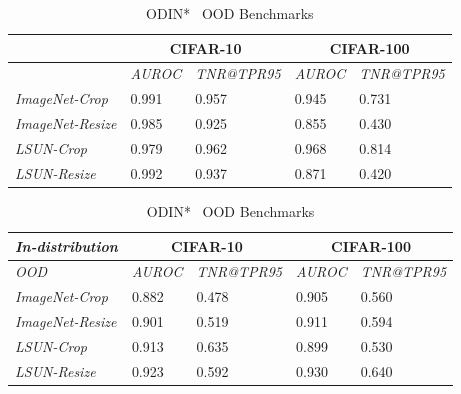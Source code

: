 \documentclass[accepted]{uai2022} %
\begin{document}
\begin{table}[t]
    \setlength\tabcolsep{4pt}
    \centering
    \caption{ODIN~\citep{Liang:ICLR:2018:ODIN} OOD Benchmarks}
        \label{Tab:ood_odin}
         
        \begin{tabular}{@{}lllll@{}}
            \toprule
                                      & \multicolumn{2}{c}{CIFAR-10}      & \multicolumn{2}{c}{CIFAR-100}     \\ \midrule
                                      & \textit{AUROC} & \textit{TNR@TPR95} & \textit{AUROC} & \textit{TNR@TPR95} \\\midrule
            \textit{ImageNet-Crop}    & 0.991          & 0.957            & 0.945          & 0.731            \\
            \textit{ImageNet-Resize}  & 0.985          & 0.925            & 0.855          & 0.430            \\
            \textit{LSUN-Crop}        & 0.979          & 0.962            & 0.968          & 0.814            \\
            \textit{LSUN-Resize}      & 0.992          & 0.937            & 0.871          & 0.420            \\ \bottomrule
        \end{tabular}

        
        \caption{ODIN*~\citep{Hsu:CVPR:2020:generalized} OOD Benchmarks}
        \label{Tab:ood_odin_star}
        
        \begin{tabular}{@{}lllll@{}}
            \toprule
            \textit{In-distribution} & \multicolumn{2}{c}{CIFAR-10}      & \multicolumn{2}{c}{CIFAR-100}     \\ \midrule
            \textit{OOD}              & \textit{AUROC} & \textit{TNR@TPR95} & \textit{AUROC} & \textit{TNR@TPR95} \\\midrule
            \textit{ImageNet-Crop}    &  0.882         & 0.478            & 0.905          &  0.560           \\
            \textit{ImageNet-Resize}  &  0.901         & 0.519            & 0.911          &  0.594           \\
            \textit{LSUN-Crop}        &  0.913         & 0.635            & 0.899          &  0.530           \\
            \textit{LSUN-Resize}      &  0.923         & 0.592            & 0.930          &  0.640           \\ \bottomrule
        \end{tabular}
    \end{table}
\end{document}
